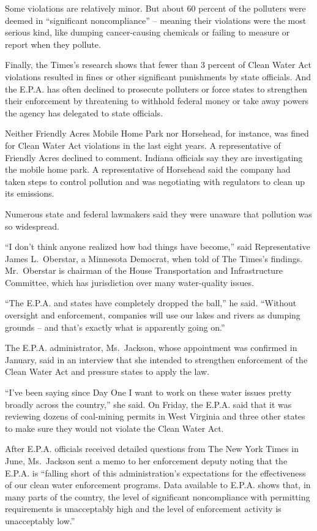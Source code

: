 ﻿\documentclass[12pt]{article}
\begin{document}
Some violations are relatively minor. But about 60 percent of the polluters were deemed in
``significant noncompliance'' -- meaning their violations were the most serious kind, like dumping
cancer-causing chemicals or failing to measure or report when they pollute.

Finally, the Times's research shows that fewer than 3 percent of Clean Water Act violations resulted
in fines or other significant punishments by state officials. And the E.P.A. has often declined to
prosecute polluters or force states to strengthen their enforcement by threatening to withhold
federal money or take away powers the agency has delegated to state officials.

Neither Friendly Acres Mobile Home Park nor Horsehead, for instance, was fined for Clean Water Act
violations in the last eight years. A representative of Friendly Acres declined to comment. Indiana
officials say they are investigating the mobile home park. A representative of Horsehead said the
company had taken steps to control pollution and was negotiating with regulators to clean up its
emissions.

Numerous state and federal lawmakers said they were unaware that pollution was so widespread.

``I don't think anyone realized how bad things have become,'' said Representative James L.~Oberstar,
a Minnesota Democrat, when told of The Times's findings. Mr.~Oberstar is chairman of the House
Transportation and Infrastructure Committee, which has jurisdiction\cite{jurisdiction} over many
water-quality issues.

``The E.P.A. and states have completely dropped the ball,'' he said. ``Without oversight and
enforcement, companies will use our lakes and rivers as dumping grounds -- and that's exactly what
is apparently going on.''

The E.P.A. administrator, Ms.~Jackson, whose appointment was confirmed in January, said in an
interview that she intended to strengthen enforcement of the Clean Water Act and pressure states to
apply the law.

``I've been saying since Day One I want to work on these water issues pretty broadly across the
country,'' she said. On Friday, the E.P.A. said that it was reviewing dozens of coal-mining permits
in West Virginia and three other states to make sure they would not violate the Clean Water Act.

After E.P.A. officials received detailed questions from The New York Times in June, Ms.~Jackson sent
a memo to her enforcement deputy noting that the E.P.A. is ``falling short of this administration's
expectations for the effectiveness of our clean water enforcement programs. Data available to E.P.A.
shows that, in many parts of the country, the level of significant noncompliance with permitting
requirements is unacceptably high and the level of enforcement activity is unacceptably low.''
\end{document}
